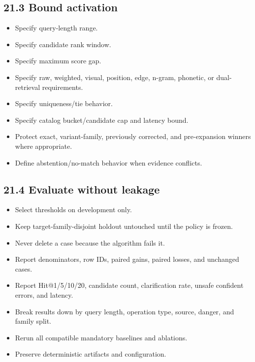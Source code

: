 \subsection{21.3 Bound activation}\label{213-bound-activation}

\begin{itemize}
\tightlist
\item[$\square$]
  Specify query-length range.
\item[$\square$]
  Specify candidate rank window.
\item[$\square$]
  Specify maximum score gap.
\item[$\square$]
  Specify raw, weighted, visual, position, edge, n-gram, phonetic, or dual-retrieval requirements.
\item[$\square$]
  Specify uniqueness/tie behavior.
\item[$\square$]
  Specify catalog bucket/candidate cap and latency bound.
\item[$\square$]
  Protect exact, variant-family, previously corrected, and pre-expansion winners where appropriate.
\item[$\square$]
  Define abstention/no-match behavior when evidence conflicts.
\end{itemize}

\subsection{21.4 Evaluate without leakage}\label{214-evaluate-without-leakage}

\begin{itemize}
\tightlist
\item[$\square$]
  Select thresholds on development only.
\item[$\square$]
  Keep target-family-disjoint holdout untouched until the policy is frozen.
\item[$\square$]
  Never delete a case because the algorithm fails it.
\item[$\square$]
  Report denominators, row IDs, paired gains, paired losses, and unchanged cases.
\item[$\square$]
  Report Hit@1/5/10/20, candidate count, clarification rate, unsafe confident errors, and latency.
\item[$\square$]
  Break results down by query length, operation type, source, danger, and family split.
\item[$\square$]
  Rerun all compatible mandatory baselines and ablations.
\item[$\square$]
  Preserve deterministic artifacts and configuration.
\end{itemize}

